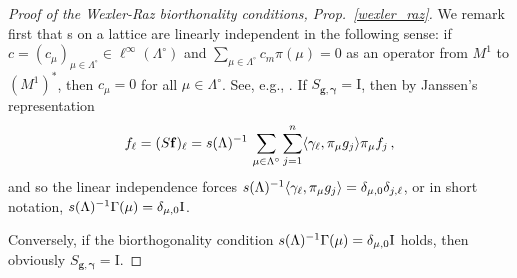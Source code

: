 \documentclass[12pt]{amsart}
\begin{document}
\smallskip

\begin{proof}[Proof of the Wexler-Raz biorthonality conditions,
  Prop.~\ref{wexler_raz}] 
 We remark first that \tfs s on a lattice are linearly
independent in the following sense:  if $c=(c_\mu )_{\mu \in \Lambda ^\circ } \in
\ell ^\infty (\Lambda ^\circ )$ and $\sum _{\mu \in \Lambda ^\circ}
c_m \pi (\mu ) = 0$ as an operator from $M^1$ to $(M^1)^* $, then
$c_\mu = 0$ for all $\mu \in \Lambda ^\circ $. See, e.g., \cite{gro07a,
rieffel88}.  
If $S_{\mathbf{g}, \mathbf{\gamma}} = \mathrm{I}$, then by Janssen's
representation 
$$
f_{\ell } = (S\mathbf{f})_{\ell} =  s(\Lambda)^{-1} \, \sum
       _{\mu \in \Lambda ^\circ } \sum _{j=1}^n \langle \gamma _{\ell } , \pi _\mu
       g_j\rangle \pi _\mu f_j \, ,
$$
and so the linear independence forces $ s(\Lambda)^{-1} \langle \gamma
_{\ell } , \pi _\mu 
       g_j\rangle = \delta _{\mu , 0} \delta _{j,\ell }$, or in short
       notation, 
$s(\Lambda )^{-1} \Gamma (\mu ) = \delta _{\mu ,0} \mathrm{I}$. 

Conversely, if the biorthogonality condition $s(\Lambda )^{-1} \Gamma
(\mu ) = \delta _{\mu ,0} \mathrm{I}$  holds, then obviously
$S_{\mathbf{g}, \mathbf{\gamma}} = \mathrm{I}$. 
\end{proof}
\medskip
\end{document}
